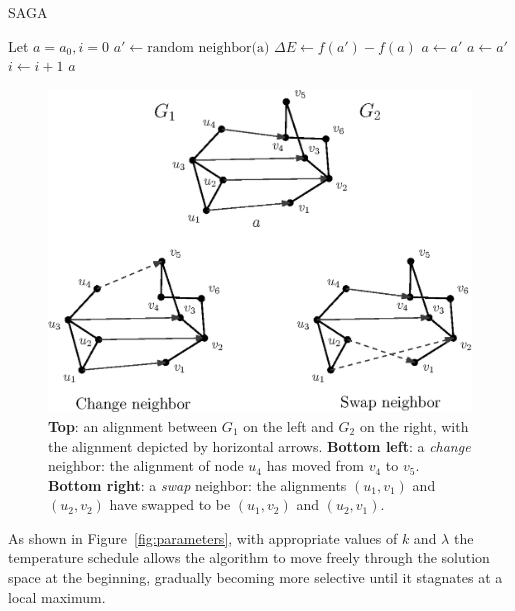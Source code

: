 \documentclass{bioinfo}
\begin{document}
\begin{methods}
\begin{algorithm}
\caption{SAGA}\label{alg:SAGA}
\begin{algorithmic}[1]
\State Let $a=a_0, i=0$
\State $a'\gets \mbox{random neighbor(a)}$
\State $\Delta E \gets f(a')-f(a)$
 $a\gets a'$
 $a\gets a'$
\EndIf
\State $i \gets i+1$
\EndWhile
\State \Return $a$
\end{algorithmic}
\end{algorithm}

\begin{figure}
\centering
\includegraphics[width=0.7\linewidth]{./operators.eps}
\caption{{\bf Top}: an alignment between $G_1$ on the left and $G_2$ on the right, with the alignment depicted by horizontal arrows.
{\bf Bottom left}: a {\it change} neighbor: the alignment of node $u_4$ has moved from $v_4$ to $v_5$.
{\bf Bottom right}: a {\it swap} neighbor: the alignments $(u_1,v_1)$ and $(u_2,v_2)$ have swapped to be $(u_1,v_2)$ and $(u_2,v_1)$.}
\label{fig:operators}
\end{figure}

As shown in Figure~\ref{fig:parameters}, with appropriate values of $k$ and $\lambda$ the temperature schedule allows the algorithm to move freely through the solution space at the beginning, gradually becoming more selective until it stagnates at a local maximum.


\end{methods}
\end{document}
